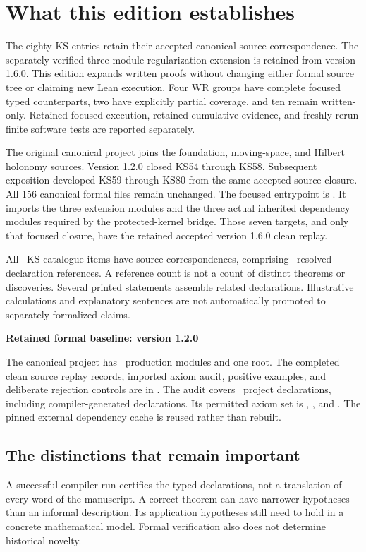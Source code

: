 \documentclass[11pt]{article}
\begin{document}
\KomorebiCover
\section*{What this edition establishes}
The eighty KS entries retain their accepted canonical source correspondence. The separately verified three-module regularization extension is retained from version 1.6.0. This edition expands written proofs without changing either formal source tree or claiming new Lean execution. Four WR groups have complete focused typed counterparts, two have explicitly partial coverage, and ten remain written-only. Retained focused execution, retained cumulative evidence, and freshly rerun finite software tests are reported separately.

The original canonical project joins the foundation, moving-space, and Hilbert holonomy sources. Version 1.2.0 closed KS54 through KS58. Subsequent exposition developed KS59 through KS80 from the same accepted source closure. All 156 canonical formal files remain unchanged. The focused entrypoint is . It imports the three extension modules and the three actual inherited dependency modules required by the protected-kernel bridge. Those seven targets, and only that focused closure, have the retained accepted version 1.6.0 clean replay.

All \EditionClaims\ KS catalogue items have source correspondences, comprising \EditionReferences\ resolved declaration references. A reference count is not a count of distinct theorems or discoveries. Several printed statements assemble related declarations. Illustrative calculations and explanatory sentences are not automatically promoted to separately formalized claims.

\begin{scopebox}
\textbf{Retained formal baseline: version 1.2.0}\par
The canonical project has \EditionFormalModules\ production modules and one root. The completed clean source replay records, imported axiom audit, positive examples, and deliberate rejection controls are in . The audit covers \EditionAuditedDeclarations\ project declarations, including compiler-generated declarations. Its permitted axiom set is , , and . The pinned external dependency cache is reused rather than rebuilt.
\end{scopebox}

\subsection*{The distinctions that remain important}
A successful compiler run certifies the typed declarations, not a translation of every word of the manuscript. A correct theorem can have narrower hypotheses than an informal description. Its application hypotheses still need to hold in a concrete mathematical model. Formal verification also does not determine historical novelty.
\end{document}

